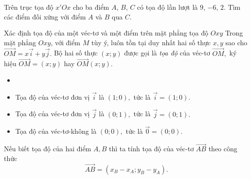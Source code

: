 \begin{bt}%
	Trên trục tọa độ $x'Ox$ cho ba điểm $A$, $B$, $C$ có tọa độ lần lượt là $9$, $-6$, $2$. Tìm các điểm đối xứng với điểm $A$ và $B$ qua $C$. 
\end{bt}

\begin{dang}%
{Xác định tọa độ của một véc-tơ và một điểm trên mặt phẳng tọa độ $Oxy$}
	Trong mặt phẳng $Oxy$, với điểm $M$ tùy ý, luôn tồn tại duy nhất hai số thực $x,y$ sao cho $\overrightarrow{OM}=x \overrightarrow{i} + y \overrightarrow{j}.$ Bộ hai số thực $(x;y)$ được gọi là \textit{tọa độ} của véc-tơ $\overrightarrow{OM},$ ký hiệu $\overrightarrow{OM}=(x;y)$ hay $\overrightarrow{OM}(x;y).$
	
	\begin{note}
		\begin{itemize}
			\item[]
			\item Tọa độ của véc-tơ đơn vị $\overrightarrow{i}$ là $(1;0),$ tức là $\overrightarrow{i}=(1;0).$
			\item Tọa độ của véc-tơ đơn vị $\overrightarrow{j}$ là $(0;1),$ tức là $\overrightarrow{j}=(0;1).$
			\item Tọa độ của véc-tơ-không là $(0;0),$ tức là $\overrightarrow{0}=(0;0).$
		\end{itemize}
	\end{note}
	
	Nếu biết tọa độ của hai điểm $A,B$ thì ta tính tọa độ của véc-tơ $\overrightarrow{AB}$ theo công thức $$\overrightarrow{AB}=(x_B-x_A;y_B-y_A).$$
	
\end{dang}


